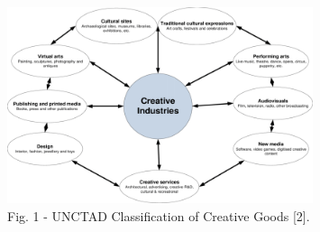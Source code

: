 \begin{figure}[H]
	\centering
	\includegraphics[width=0.8\textwidth]{assets/1120}
	\caption*{Fig. 1 - UNCTAD Classification of Creative Goods {[}2{]}.}
\end{figure}


